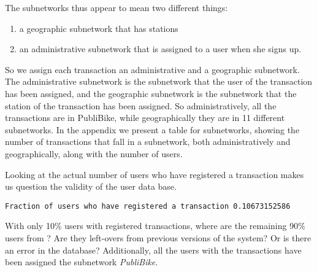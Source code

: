 \documentclass{report}
\begin{document}
    The subnetworks thus appear to mean two different things:

\begin{enumerate}
\def\labelenumi{\arabic{enumi}.}
\item
  a geographic subnetwork that has stations
\item
  an administrative subnetwork that is assigned to a user when she signs
  up.
\end{enumerate}







    So we assign each transaction an administrative and a geographic
subnetwork. The administrative subnetwork is the subnetwork that the
user of the transaction has been assigned, and the geographic subnetwork
is the subnetwork that the station of the transaction has been assigned.
So administratively, all the transactions are in PubliBike, while
geographically they are in 11 different subnetworks. In the appendix we
present a table for subnetworks, showing the number of transactions that
fall in a subnetwork, both administratively and geographically, along
with the number of users.

Looking at the actual number of users who have registered a transaction
makes us question the validity of the user data base.


    \begin{Verbatim}[commandchars=\\\{\}]
Fraction of users who have registered a transaction 0.10673152586
    \end{Verbatim}

    With only 10\% users with registered transactions, where are the
remaining 90\% users from ? Are they left-overs from previous versions
of the system? Or is there an error in the database? Additionally, all
the users with the transactions have been assigned the subnetwork
\emph{PubliBike}.




        
    \begin{center}
    \end{center}
    { \hspace*{\fill} \\}
    
    \begin{center}
    \end{center}
    { \hspace*{\fill} \\}
    
\end{document}
